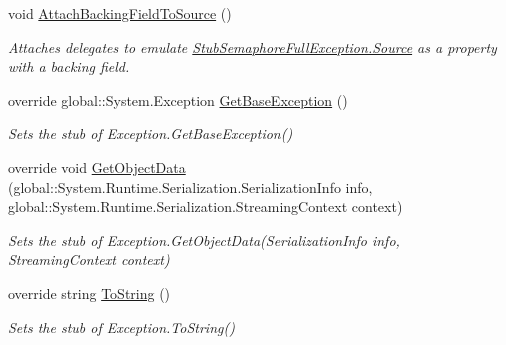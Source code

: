 \begin{DoxyCompactItemize}
void \hyperlink{class_system_1_1_threading_1_1_fakes_1_1_stub_semaphore_full_exception_a8106f10cf80baafdbb0eada3af49f73a}{Attach\-Backing\-Field\-To\-Source} ()
\begin{DoxyCompactList}\small\item\em Attaches delegates to emulate \hyperlink{class_system_1_1_threading_1_1_fakes_1_1_stub_semaphore_full_exception_a978ea92420abe7c0dcc7cda2dcbd737e}{Stub\-Semaphore\-Full\-Exception.\-Source} as a property with a backing field.\end{DoxyCompactList}\item 
override global\-::\-System.\-Exception \hyperlink{class_system_1_1_threading_1_1_fakes_1_1_stub_semaphore_full_exception_accbf00577de814e7e9a69f7f9ea96147}{Get\-Base\-Exception} ()
\begin{DoxyCompactList}\small\item\em Sets the stub of Exception.\-Get\-Base\-Exception()\end{DoxyCompactList}\item 
override void \hyperlink{class_system_1_1_threading_1_1_fakes_1_1_stub_semaphore_full_exception_a673c54ade734c1690c4c6b9a0db785cd}{Get\-Object\-Data} (global\-::\-System.\-Runtime.\-Serialization.\-Serialization\-Info info, global\-::\-System.\-Runtime.\-Serialization.\-Streaming\-Context context)
\begin{DoxyCompactList}\small\item\em Sets the stub of Exception.\-Get\-Object\-Data(\-Serialization\-Info info, Streaming\-Context context)\end{DoxyCompactList}\item 
override string \hyperlink{class_system_1_1_threading_1_1_fakes_1_1_stub_semaphore_full_exception_a303f4e8f35f61a09038334b26e7aaaa5}{To\-String} ()
\begin{DoxyCompactList}\small\item\em Sets the stub of Exception.\-To\-String()\end{DoxyCompactList}\end{DoxyCompactItemize}
